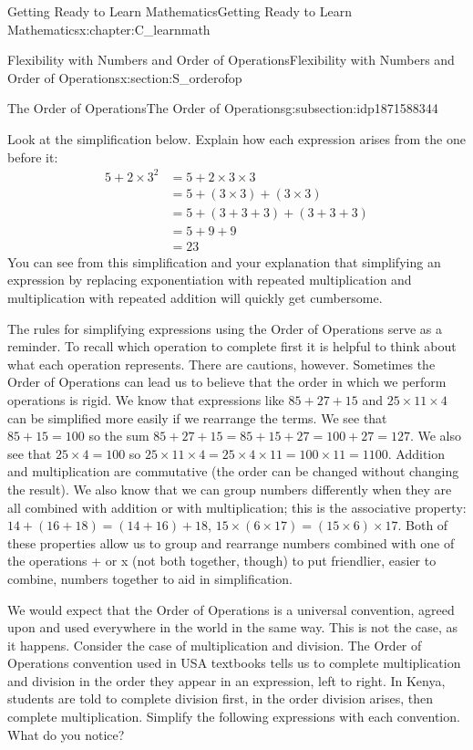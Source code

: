 \documentclass[oneside,10pt,]{book}
\numberwithin{equation}{chapter}
\newcommand{\amp}{&}
\begin{document}
\begin{chapterptx}{Getting Ready to Learn Mathematics}{}{Getting Ready to Learn Mathematics}{}{}{x:chapter:C_learnmath}
\begin{sectionptx}{Flexibility with Numbers and Order of Operations}{}{Flexibility with Numbers and Order of Operations}{}{}{x:section:S_orderofop}
\begin{subsectionptx}{The Order of Operations}{}{The Order of Operations}{}{}{g:subsection:idp1871588344}
\begin{equation*}
\end{equation*}
%
\par
Look at the simplification below. Explain how each expression arises from the one before it:%
\begin{align*}
5 + 2 \times 3^2 \amp = 5 + 2 \times 3 \times 3\\
\amp = 5 + (3 \times 3) + (3 \times 3)\\
\amp = 5 + (3 + 3 + 3) + (3 + 3 + 3)\\
\amp = 5 + 9 + 9\\
\amp = 23
\end{align*}
You can see from this simplification and your explanation that simplifying an expression by replacing exponentiation with repeated multiplication and multiplication with repeated addition will quickly get cumbersome.%
\par
The rules for simplifying expressions using the Order of Operations serve as a reminder. To recall which operation to complete first it is helpful to think about what each operation represents. There are cautions, however. Sometimes the Order of Operations can lead us to believe that the order in which we perform operations is rigid. We know that expressions like \(85 + 27 + 15\) and \(25 \times 11 \times 4\) can be simplified more easily if we rearrange the terms. We see that \(85 + 15 = 100\) so the sum \(85 + 27 + 15 = 85 + 15 + 27 = 100 + 27 = 127\). We also see that \(25 \times 4 = 100\) so \(25 \times 11 \times 4 = 25 \times 4 \times 11 = 100 \times 11 = 1100\). Addition and multiplication are commutative (the order can be changed without changing the result). We also know that we can group numbers differently when they are all combined with addition or with multiplication; this is the associative property: \(14 + (16 + 18) = (14 + 16) + 18\), \(15 \times (6 \times 17) = (15 \times 6) \times 17\). Both of these properties allow us to group and rearrange numbers combined with one of the operations + or x (not both together, though) to put friendlier, easier to combine, numbers together to aid in simplification.%
\par
We would expect that the Order of Operations is a universal convention, agreed upon and used everywhere in the world in the same way. This is not the case, as it happens. Consider the case of multiplication and division. The Order of Operations convention used in USA textbooks tells us to complete multiplication and division in the order they appear in an expression, left to right. In Kenya, students are told to complete division first, in the order division arises, then complete multiplication. Simplify the following expressions with each convention. What do you notice?%

\end{subsectionptx}
\end{sectionptx}
\end{chapterptx}
\end{document}
